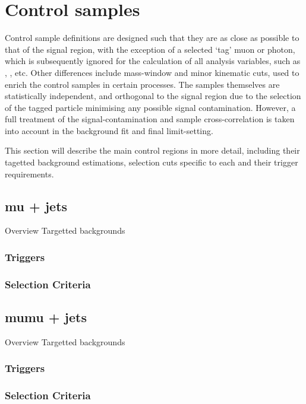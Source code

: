 \section{Control samples}  %
\label{sec:background_control}

Control sample definitions are designed such that they are as close as possible 
to that of the signal region, with the exception of a selected `tag' muon or 
photon, which is subsequently ignored for the calculation of all analysis 
variables, such as \HT, \mht, \alphat etc. Other differences include mass-window
and minor kinematic cuts, used to enrich the control samples in certain processes. 
The samples themselves are statistically independent, and orthogonal to the 
signal region due to the selection of the tagged particle minimising any 
possible signal contamination. However, a full treatment of the
signal-contamination and sample cross-correlation is taken into account in the
background fit and final limit-setting. 

This section will describe the main control regions in more detail, including 
their tagetted background estimations, selection cuts specific to each and their
trigger requirements.

\subsection{mu + jets}
Overview
Targetted backgrounds
\subsubsection{Triggers}
\subsubsection{Selection Criteria}

\subsection{mumu + jets}
Overview
Targetted backgrounds
\subsubsection{Triggers}
\subsubsection{Selection Criteria}


